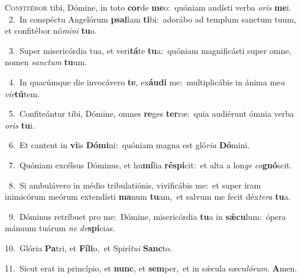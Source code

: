 \lettrine{\initial\textcolor{\initialcolor}{C}}{onfitébor} tibi, Dómine, in toto \textbf{cor}\-de \textbf{me}\-o:~\star quóniam audísti verba \textit{o}\-\textit{ris} \textbf{me}\-i.\\
{\numbfont\textcolor{\numbcolor}{~2.}}~In conspéctu Angelórum \textbf{psal}\-lam \textbf{ti}\-bi:~\star adorábo ad templum sanctum tuum, et confitébor nó\-\textit{mi}\-\textit{ni} \textbf{tu}\-o.\par
{\numbfont\textcolor{\numbcolor}{~3.}}~Super misericórdia tua, et veri\-\textbf{tá}\-te \textbf{tu}\-a:~\star quóniam magnificásti super omne, nomen \textit{sanc}\-\textit{tum} \textbf{tu}\-um.\par
{\numbfont\textcolor{\numbcolor}{~4.}}~In quacúmque die invocávero \textbf{te}\-, ex\-\textbf{áu}\-\textbf{di} me:~\star multiplicábis in ánima me\textit{a} \textit{vir}\-\textbf{tú}tem.\par
{\numbfont\textcolor{\numbcolor}{~5.}}~Confiteántur tibi, Dómine, omnes \textbf{re}\-ges \textbf{ter}\-ræ:~\star quia audiérunt ómnia verba \textit{o}\-\textit{ris} \textbf{tu}\-i.\par
{\numbfont\textcolor{\numbcolor}{~6.}}~Et cantent in \textbf{vi}\-is \textbf{Dó}\-\textbf{mi}ni:~\star quóniam magna est gló\-\textit{ri}\-\textit{a} \textbf{Dó}\-mini.\par
{\numbfont\textcolor{\numbcolor}{~7.}}~Quóniam excélsus Dóminus, et hu\-\textbf{mí}\-lia \textbf{ré}\-\textbf{spi}cit:~\star et alta a lon\textit{ge} \textit{co}\-\textbf{gnó}scit.\par
{\numbfont\textcolor{\numbcolor}{~8.}}~Si ambulávero in médio tribulatiónis, vivificábis me:~\dagger et super iram inimicórum meórum extendísti \textbf{ma}\-num \textbf{tu}\-am,~\star et salvum me fecit déx\-\textit{te}\-\textit{ra} \textbf{tu}\-a.\par
{\numbfont\textcolor{\numbcolor}{~9.}}~Dóminus retríbuet pro me:~\dagger Dómine, misericórdia \textbf{tu}\-a in \textbf{sǽ}\-\textbf{cu}lum:~\star ópera mánuum tuárum \textit{ne} \textit{de}\-\textbf{spí}cias.\par
{\numbfont\textcolor{\numbcolor}{10.}}~Glória \textbf{Pa}\-tri, et \textbf{Fí}\-\textbf{li}o,~\star et Spirí\-\textit{tu}\-\textit{i} \textbf{Sanc}\-to.\par
{\numbfont\textcolor{\numbcolor}{11.}}~Sicut erat in princípio, et \textbf{nunc}\-, et \textbf{sem}\-per,~\star et in sǽcula sæcu\-\textit{ló}\-\textit{rum}. \textbf{A}\-men.\par
